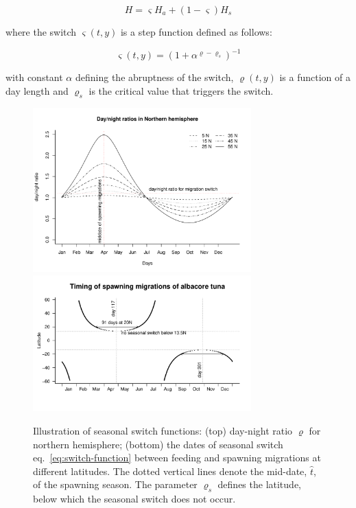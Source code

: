 \begin{equation}
  H = \varsigma H_a+(1-\varsigma) H_s	
\label{eq:seasonal-habitat}
\end{equation}

\noindent where the switch $\varsigma(t,y)$ is a step function defined as follows:

\begin{equation}
\varsigma(t,y)=\left(1+\alpha^{\varrho-\varrho_s} \right)^{-1} 
\label{eq:switch-function}
\end{equation}

\noindent with constant $\alpha$ defining the abruptness of the switch, $\varrho(t,y)$ is a function of a day length and $\varrho_s$ is the critical value that triggers the switch. 

\begin{figure}[htbp]
  \centering
  \includegraphics[width=0.75\textwidth]{chapter1/figs/DN-ratio}\\
  \includegraphics[width=0.75\textwidth]{chapter1/figs/seasonal_switch}
  \caption{Illustration of seasonal switch functions: (top) day-night ratio $\varrho$ for northern hemisphere; (bottom) the dates of seasonal switch eq.~\ref{eq:switch-function} between feeding and spawning migrations at different latitudes. The dotted vertical lines denote the mid-date, $\hat{t}$, of the spawning season. The parameter $\varrho_s$ defines the latitude, below which the seasonal switch does not occur. }
  \label{fig:seasonal-switch}
\end{figure}

